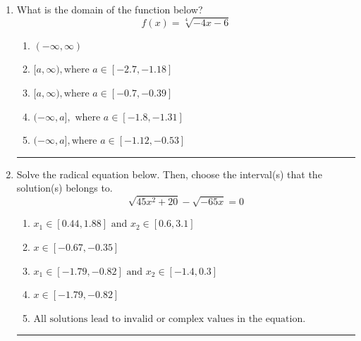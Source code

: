 \documentclass[14pt]{extbook}
\newcommand{\litem}[1]{\item#1\hspace*{-1cm}\rule{\textwidth}{0.4pt}}
\begin{document}
\begin{enumerate}
{\begin{enumerate}[label=\Alph*.]
\end{enumerate} }
\litem{
What is the domain of the function below?\[ f(x) = \sqrt[4]{-4 x - 6} \]\begin{enumerate}[label=\Alph*.]
\item \( (-\infty, \infty) \)
\item \( [a, \infty), \text{where } a \in [-2.7, -1.18] \)
\item \( [a, \infty), \text{where } a \in [-0.7, -0.39] \)
\item \( (-\infty, a], \text{ where } a \in [-1.8, -1.31] \)
\item \( (-\infty, a], \text{where } a \in [-1.12, -0.53] \)

\end{enumerate} }
\litem{
Solve the radical equation below. Then, choose the interval(s) that the solution(s) belongs to.\[ \sqrt{45 x^2 + 20} - \sqrt{-65 x} = 0 \]\begin{enumerate}[label=\Alph*.]
\item \( x_1 \in [0.44, 1.88] \text{ and } x_2 \in [0.6,3.1] \)
\item \( x \in [-0.67,-0.35] \)
\item \( x_1 \in [-1.79, -0.82] \text{ and } x_2 \in [-1.4,0.3] \)
\item \( x \in [-1.79,-0.82] \)
\item \( \text{All solutions lead to invalid or complex values in the equation.} \)


\end{enumerate}}
\end{enumerate}
\end{document}
